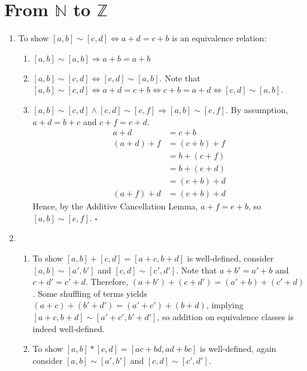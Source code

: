\documentclass{article}
\newcommand{\N}{\mathbb{N}}
\newcommand{\Z}{\mathbb{Z}}
\begin{document}
\section{From $\N$ to $\Z$}
  \begin{enumerate}[label=\textbf{(\alph*)}]
    \item{
      To show $[a,b] \sim [c,d] \iff a+d=c+b$ is an equivalence relation:
      \begin{enumerate}[label=(\arabic*)]
        \item{
          $[a,b] \sim [a,b] \Rightarrow a+b=a+b$
        }
        \item{
          $[a,b] \sim [c,d] \Leftrightarrow [c,d] \sim [a,b]$. Note that
          $[a,b]\sim[c,d]
            \Leftrightarrow a+d=c+b
            \Leftrightarrow c+b=a+d
            \Leftrightarrow [c,d]\sim[a,b]
          $.
        }
        \item{
          $[a,b]\sim[c,d]\wedge[c,d]\sim[e,f]\Rightarrow[a,b]\sim[e,f]$. By
          assumption, $a+d=b+c$ and $c+f=e+d$.
          \begin{align*}
                a+d &= c+b      \\
            (a+d)+f &=(c+b)+f   \\
                    &= b+(c+f)  \\
                    &= b+(e+d)  \\
                    &= (e+b)+d  \\
            (a+f)+d &=(e+b)+d
          \end{align*}
          Hence, by the Additive Cancellation Lemma, $a+f=e+b$, so
          $[a,b]\sim[e,f]$.
          \hfill $\square$
        }
      \end{enumerate}
    }
    \item{
      \begin{enumerate}[label=(\arabic*)]
        \item{
          To show $[a,b]+[c,d]=[a+c,b+d]$ is well-defined, consider
          $[a,b]\sim[a',b']$ and $[c,d]\sim[c',d']$. Note that $a+b'=a'+b$ and
          $c+d'=c'+d$. Therefore, $(a+b')+(c+d')=(a'+b)+(c'+d)$. Some shuffling
          of terms yields $(a+c)+(b'+d')=(a'+c')+(b+d)$, implying $[a+c,b+d]\sim
          [a'+c',b'+d']$, so addition on equivalence classes is indeed
          well-defined.
        }
        \item{
          To show $[a,b]*[c,d]=[ac+bd,ad+bc]$ is well-defined, again consider
          $[a,b]\sim[a',b']$ and $[c,d]\sim[c',d']$.

}
\end{enumerate}}
\end{enumerate}
\end{document}
